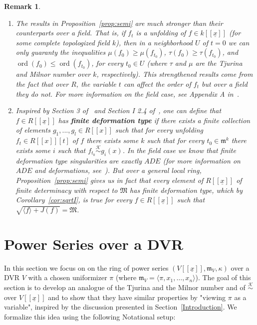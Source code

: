 \documentclass{article}
\newtheorem{remark}[theorem]{Remark}
\DeclareMathOperator{\ord}{ord}
\newcommand{\equivk}{\overset{\mathcal{K}}{\sim}}
\newcommand{\maxV}{\mathfrak{m}_V}
\newcommand{\Vx}{V[[\underline{x}]]}
\numberwithin{theorem}{section}
\begin{document}
\begin{remark}\label{rem:unfolding}
\begin{enumerate}
    \item \textup{The results in Proposition~\ref{prop:semi} are much stronger than their counterparts over a field. That is, if $f_t$ is a unfolding of $f \in k[[\underline{x}]]$ (for some complete topologized field $k$), then in a neighborhood $U$ of $t=0$ we can only guaranty the inequalities $\mu\left(f_0\right) \geq \mu\left(f_{t_0}\right)$, $\tau\left(f_0\right) \geq \tau\left(f_{t_0}\right)$, and $\ord\left(f_0\right) \leq \ord\left(f_{t_0}\right)$, for every $t_0 \in U$ (where $\tau$ and $\mu$ are the Tjurina and Milnor number over $k$, respectively). This strengthened results come from the fact that over $R$, the variable $t$ can affect the order of $f_t$ but over a field they do not. For more information on the field case, see Appendix A in~\cite{greuel2016right}. } 
    \item \textup{Inspired by Section 3 of~\cite{greuel2017singularities} and Section I 2.4 of~\cite{greuel2007introduction}, one can define that $f \in R[[\underline{x}]]$ has \textbf{finite deformation type} if there exists a finite collection of elements $g_1, ..., g_l \in R[[x]]$ such that for every unfolding $f_t \in R[[x]][t]$ of $f$  there exists some $k$ such that for every $t_0 \in \mathfrak{m}^k$ there exists some $i$ such that $f_{t_0} \equivk g_i\left(x\right)$. In the field case we know that finite deformation type singularities are exactly $ADE$ (for more information on $ADE$ and deformations, see~\cite{greuel1990simple, greuel2017singularities}). But over a general local ring, Proposition~\ref{prop:semi} gives us in fact that every element of $R[[\underline{x}]]$ of finite determinacy with respect to $\mathfrak{M}$ has finite deformation type, which by Corollary~\ref{cor:sqrtI}, is true for every $f \in R[[\underline{x}]]$ such that $\sqrt{\langle f \rangle + J(f)} = \mathfrak{M}$.}
\end{enumerate}
 \end{remark}

\section{Power Series over a DVR}\label{sec:V_power_series}

In this section we focus on on the ring of power series $(\Vx, \maxV, \kappa)$ over a DVR $V$ with a chosen uniformizer $\pi$ (where $\maxV=\langle \pi, x_1, \dots, x_n\rangle$). The goal of this section is to develop an analogue of the Tjurina and the Milnor number and of $\equivk$ over $\Vx$ and to show that they have similar properties by "viewing $\pi$ as a variable", inspired by the discussion presented in Section~\ref{Introduction}. We formalize this idea using the following Notational setup:
\end{document}
